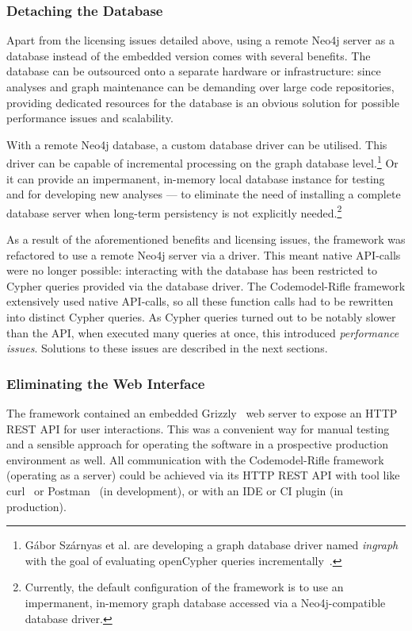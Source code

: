 \subsubsection{Detaching the Database}

Apart from the licensing issues detailed above, using a remote Neo4j server as a database instead of the embedded version comes with several benefits. The database can be outsourced onto a separate hardware or infrastructure: since analyses and graph maintenance can be demanding over large code repositories, providing dedicated resources for the database is an obvious solution for possible performance issues and scalability.

With a remote Neo4j database, a custom database driver can be utilised. This driver can be capable of incremental processing on the graph database level.\footnote{Gábor Szárnyas et al. are developing a graph database driver named \emph{ingraph} with the goal of evaluating openCypher queries incrementally~\cite{ingraph-github}.} Or it can provide an impermanent, in-memory local database instance for testing and for developing new analyses — to eliminate the need of installing a complete database server when long-term persistency is not explicitly needed.\footnote{Currently, the default configuration of the framework is to use an impermanent, in-memory graph database accessed via a Neo4j-compatible database driver.}

As a result of the aforementioned benefits and licensing issues, the framework was refactored to use a remote Neo4j server via a driver. This meant native API-calls were no longer possible: interacting with the database has been restricted to Cypher queries provided via the database driver. The Codemodel-Rifle framework extensively used native API-calls, so all these function calls had to be rewritten into distinct Cypher queries. As Cypher queries turned out to be notably slower than the API, when executed many queries at once, this introduced \emph{performance issues}. Solutions to these issues are described in the next sections.


\subsubsection{Eliminating the Web Interface}

The framework contained an embedded Grizzly~\cite{grizzly-website} web server to expose an HTTP REST API for user interactions. This was a convenient way for manual testing and a sensible approach for operating the software in a prospective production environment as well. All communication with the Codemodel-Rifle framework (operating as a server) could be achieved via its HTTP REST API with tool like curl~\cite{curl-website} or Postman~\cite{postman-website} (in development), or with an IDE or CI plugin (in production).

